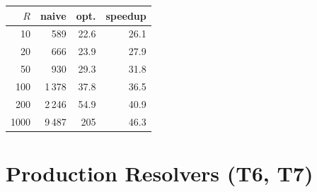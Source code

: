 \bigskip
\noindent\begin{minipage}{\textwidth}
  \centering
  {\captionsetup{textfont=sf}
  \label{tab:eval-t5}}
    \small
    \setlength{\tabcolsep}{4pt}
    \begin{tabular}{|r|r|r|r|}
      \hline
      \textbf{$R$} & \textbf{naive} & \textbf{opt.} & \textbf{speedup} \\
      \hline
      10   & 589     & 22.6 & 26.1 \\
      \hline
      20   & 666     & 23.9 & 27.9 \\
      \hline
      50   & 930     & 29.3 & 31.8 \\
      \hline
      100  & 1\,378  & 37.8 & 36.5 \\
      \hline
      200  & 2\,246  & 54.9 & 40.9 \\
      \hline
      1000 & 9\,487  & 205  & 46.3 \\
      \hline
    \end{tabular}
  \normalsize
\end{minipage}

\FloatBlock
\section{Production Resolvers (T6, T7)}

